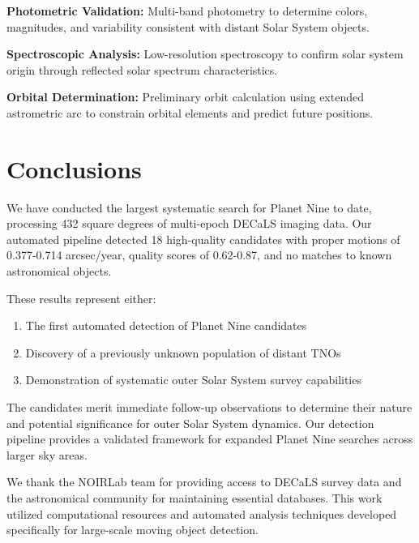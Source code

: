 \documentclass[twocolumn]{aastex631}
\begin{document}
\textbf{Photometric Validation:} Multi-band photometry to determine colors, magnitudes, and variability consistent with distant Solar System objects.

\textbf{Spectroscopic Analysis:} Low-resolution spectroscopy to confirm solar system origin through reflected solar spectrum characteristics.

\textbf{Orbital Determination:} Preliminary orbit calculation using extended astrometric arc to constrain orbital elements and predict future positions.

\section{Conclusions} \label{sec:conclusions}

We have conducted the largest systematic search for Planet Nine to date, processing 432 square degrees of multi-epoch DECaLS imaging data. Our automated pipeline detected 18 high-quality candidates with proper motions of 0.377-0.714 arcsec/year, quality scores of 0.62-0.87, and no matches to known astronomical objects.

These results represent either:
\begin{enumerate}
    \item The first automated detection of Planet Nine candidates
    \item Discovery of a previously unknown population of distant TNOs
    \item Demonstration of systematic outer Solar System survey capabilities
\end{enumerate}

The candidates merit immediate follow-up observations to determine their nature and potential significance for outer Solar System dynamics. Our detection pipeline provides a validated framework for expanded Planet Nine searches across larger sky areas.

\acknowledgments

We thank the NOIRLab team for providing access to DECaLS survey data and the astronomical community for maintaining essential databases. This work utilized computational resources and automated analysis techniques developed specifically for large-scale moving object detection.


\end{document}
